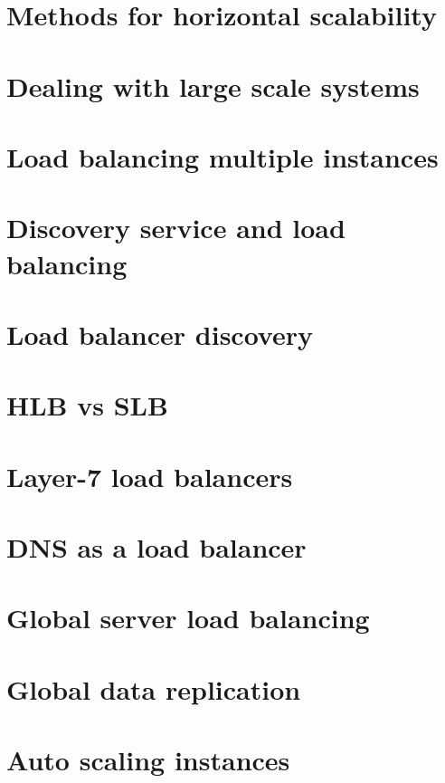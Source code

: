 \documentclass[11pt]{article}
\begin{document}
\section{Methods for horizontal scalability}

\section{Dealing with large scale systems}

\section{Load balancing multiple instances}

\section{Discovery service and load balancing}

\section{Load balancer discovery}

\section{HLB vs SLB}

\section{Layer-7 load balancers}

\section{DNS as a load balancer}

\section{Global server load balancing}

\section{Global data replication}

\section{Auto scaling instances}
\end{document}
